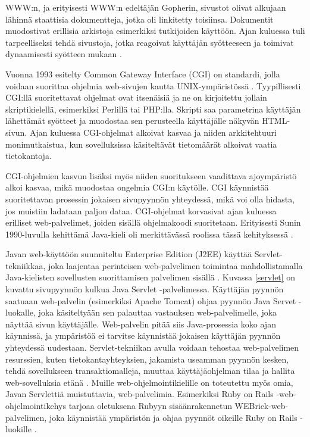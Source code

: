 WWW:n, ja erityisesti WWW:n edeltäjän Gopherin, sivustot olivat alkujaan lähinnä staattisia dokumentteja, jotka oli linkitetty toisiinsa. Dokumentit muodostivat erillisia arkistoja esimerkiksi tutkijoiden käyttöön. Ajan kuluessa tuli tarpeelliseksi tehdä sivustoja, jotka reagoivat käyttäjän syötteeseen ja toimivat dynaamisesti syötteen mukaan \cite{dynamic}.

Vuonna 1993 esitelty Common Gateway Interface (CGI) on standardi, jolla voidaan suorittaa ohjelmia web-sivujen kautta UNIX-ympäristössä \cite{rfc3875}. Tyypillisesti CGI:llä suoritettavat ohjelmat ovat itsenäisiä ja ne on kirjoitettu jollain skriptikielellä, esimerkiksi Perlillä tai PHP:lla. Skripti saa parametrina käyttäjän lähettämät syötteet ja muodostaa sen perusteella käyttäjälle näkyvän HTML-sivun. Ajan kuluessa CGI-ohjelmat alkoivat kasvaa ja niiden arkkitehtuuri monimutkaistua, kun sovelluksissa käsiteltävät tietomäärät alkoivat vaatia tietokantoja.

CGI-ohjelmien kasvun lisäksi myös niiden suoritukseen vaadittava ajoympäristö alkoi kasvaa, mikä muodostaa ongelmia CGI:n käytölle. CGI käynnistää suoritettavan prosessin jokaisen sivupyynnön yhteydessä, mikä voi olla hidasta, jos muistiin ladataan paljon dataa. CGI-ohjelmat korvasivat ajan kuluessa erilliset web-palvelimet, joiden sisällä ohjelmakoodi suoritetaan. Erityisesti Sunin 1990-luvulla kehittämä Java-kieli oli merkittävässä roolissa tässä kehityksessä \cite{uml}.

Javan web-käyttöön suunniteltu Enterprise Edition (J2EE) käyttää Serv\-let-tek\-niik\-kaa, joka laajentaa perinteisen web-palvelimen toimintaa mahdollistamalla Java-kielisten sovellusten suorittamisen palvelimen sisällä \cite{j2ee} . Kuvassa \ref{servlet} on kuvattu sivupyynnön kulkua Java Servlet -palvelimessa. Käyttäjän pyynnön saatuaan web-palvelin (esimerkiksi Apache Tomcat) ohjaa pyynnön Java Servet -luokalle, joka käsiteltyään sen palauttaa vastauksen web-palvelimelle, joka näyttää sivun käyttäjälle. Web-palvelin pitää siis Java-prosessia koko ajan käynnissä, ja ympäristöä ei tarvitse käynnistää jokaisen käyttäjän pyynnön yhteydessä uudestaan. Servlet-tekniikan avulla voidaan tehostaa web-palvelimen resurssien, kuten tietokantayhteyksien, jakamista useamman pyynnön kesken, tehdä sovellukseen transaktiomalleja, muuttaa käyttäjäohjelman tilaa ja hallita web-sovelluksia etänä \cite{uml}. Muille web-ohjelmointikielille on toteutettu myös omia, Javan Servlettiä muistuttavia, web-palvelimia. Esimerkiksi Ruby on Rails -web-ohjelmointikehys tarjoaa oletuksena Rubyyn sisäänrakennetun WEBrick-web-palvelimen, joka käynnistää ympäristön ja ohjaa pyynnöt oikeille Ruby on Rails -luokille \cite{ruby2011agile}.

